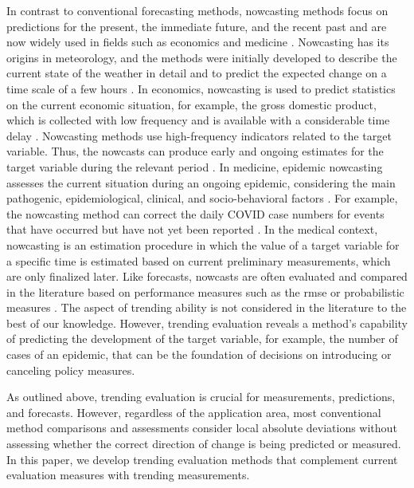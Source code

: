 In contrast to conventional forecasting methods, nowcasting methods focus on predictions for the present, the immediate future, and the recent past \parencite{banbura2013now} and are now widely used in fields such as economics and medicine \parencite{bok2018macroeconomic, Wolffram2023}.
Nowcasting has its origins in meteorology, and the methods were initially developed to describe the current state of the weather in detail and to predict the expected change on a time scale of a few hours \parencite{browning1989nowcasting,schmid2019nowcasting}. 
In economics, nowcasting is used to predict statistics on the current economic situation, for example, the gross domestic product, which is collected with low frequency and is available with a considerable time delay \parencite{banbura2013now}.
Nowcasting methods use high-frequency indicators related to the target variable.
Thus, the nowcasts can produce early and ongoing estimates for the target variable during the relevant period \parencite{castle2017forecasting}. 
In medicine, epidemic nowcasting assesses the current situation during an ongoing epidemic, considering the main pathogenic, epidemiological, clinical, and socio-behavioral factors \parencite{wu2021nowcasting}. 
For example, the nowcasting method can correct the daily COVID case numbers for events that have occurred but have not yet been reported \parencite{gunther2021nowcasting}. 
In the medical context, nowcasting is an estimation procedure in which the value of a target variable for a specific time is estimated based on current preliminary measurements, which are only finalized later. 
Like forecasts, nowcasts are often evaluated and compared in the literature based on performance measures such as the \ac{rmse} \parencite{gunther2021nowcasting} or probabilistic measures \parencite{Wolffram2023}. 
The aspect of trending ability is not considered in the literature to the best of our knowledge. 
However, trending evaluation reveals a method's capability of predicting the development of the target variable, for example, the number of cases of an epidemic, that can be the foundation of decisions on introducing or canceling policy measures. 

As outlined above, trending evaluation is crucial for measurements, predictions, and forecasts. 
However, regardless of the application area, most conventional method comparisons and assessments consider local absolute deviations without assessing whether the correct direction of change is being predicted or measured. 
In this paper, we develop trending evaluation methods that complement current evaluation measures with trending measurements.

